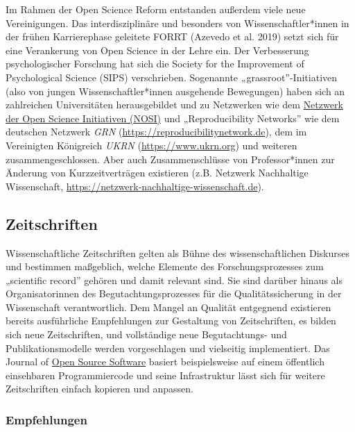 \documentclass[
  letterpaper,
  DIV=11,
  numbers=noendperiod]{scrreprt}
\begin{document}
Im Rahmen der Open Science Reform entstanden außerdem viele neue
Vereinigungen. Das interdisziplinäre und besonders von
Wissenschaftler*innen in der frühen Karrierephase geleitete FORRT
(Azevedo et al. 2019) setzt sich für eine Verankerung von Open Science
in der Lehre ein. Der Verbesserung psychologischer Forschung hat sich
die Society for the Improvement of Psychological Science (SIPS)
verschrieben. Sogenannte „grassroot''-Initiativen (also von jungen
Wissenschaftler*innen ausgehende Bewegungen) haben sich an zahlreichen
Universitäten herausgebildet und zu Netzwerken wie dem
\href{https://osf.io/tbkzh/}{Netzwerk der Open Science Initiativen
(NOSI)} und „Reproducibility Networks'' wie dem deutschen Netzwerk
\emph{GRN} (\url{https://reproducibilitynetwork.de}), dem im Vereinigten
Königreich \emph{UKRN} (\url{https://www.ukrn.org}) und weiteren
zusammengeschlossen. Aber auch Zusammenschlüsse von Professor*innen zur
Änderung von Kurzzeitverträgen existieren (z.B. Netzwerk Nachhaltige
Wissenschaft, \url{https://netzwerk-nachhaltige-wissenschaft.de}).

\subsection{Zeitschriften}\label{zeitschriften}

Wissenschaftliche Zeitschriften gelten als Bühne des wissenschaftlichen
Diskurses und bestimmen maßgeblich, welche Elemente des
Forschungsprozesses zum „scientific record'' gehören und damit relevant
sind. Sie sind darüber hinaus als Organisatorinnen des
Begutachtungsprozesses für die Qualitätssicherung in der Wissenschaft
verantwortlich. Dem Mangel an Qualität entgegnend existieren bereits
ausführliche Empfehlungen zur Gestaltung von Zeitschriften, es bilden
sich neue Zeitschriften, und vollständige neue Begutachtungs- und
Publikationsmodelle werden vorgeschlagen und vielseitig implementiert.
Das Journal of \href{https://joss.theoj.org}{Open Source Software}
basiert beispielsweise auf einem öffentlich einsehbaren Programmiercode
und seine Infrastruktur lässt sich für weitere Zeitschriften einfach
kopieren und anpassen.

\subsubsection{Empfehlungen}\label{empfehlungen}
\end{document}
